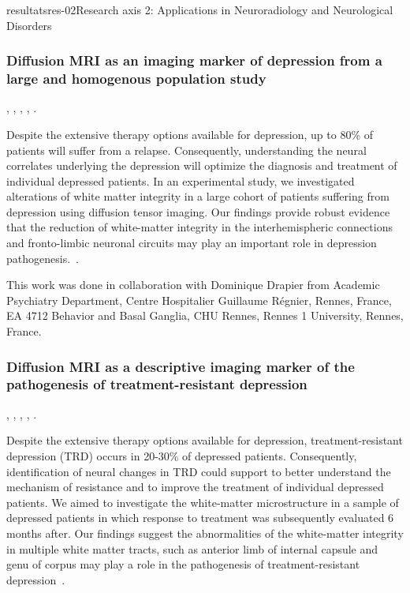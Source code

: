 \documentclass{ra2018}
\begin{document}
\begin{module}{resultats}{res-02}{Research axis 2: Applications in Neuroradiology and Neurological Disorders}
\subsubsection{Diffusion MRI as an imaging marker of depression from a large and homogenous population study}
\begin{participants}
      ,
      ,
      ,
      ,
      .
\end{participants}
Despite the extensive therapy options available for depression, up to 80\% of patients will suffer from a relapse. Consequently, understanding the neural correlates underlying the depression will optimize the diagnosis and treatment of individual depressed patients. In an experimental study, we investigated alterations of white matter integrity in a large cohort of patients suffering from depression using diffusion tensor imaging. Our findings provide robust evidence that the reduction of white-matter integrity in the interhemispheric connections and fronto-limbic neuronal circuits may play an important role in depression pathogenesis.~\cite{coloigner:hal-01812093}. 

This work was done in collaboration with Dominique Drapier from Academic Psychiatry Department, Centre Hospitalier Guillaume Régnier, Rennes, France, EA 4712 Behavior and Basal Ganglia, CHU Rennes, Rennes 1 University, Rennes, France.

\subsubsection{Diffusion MRI as a descriptive imaging marker of the pathogenesis of treatment-resistant depression}
\begin{participants}
      ,
      ,
      ,
      ,
      .
\end{participants}
Despite the extensive therapy options available for depression, treatment-resistant depression (TRD) occurs in 20-30\% of depressed patients. Consequently, identification of neural changes in TRD could support to better understand the mechanism of resistance and to improve the treatment of individual depressed patients. We aimed to investigate the white-matter microstructure in a sample of depressed patients in which response to treatment was subsequently evaluated 6 months after. Our findings suggest the abnormalities of the white-matter integrity in multiple white matter tracts, such as anterior limb of internal capsule and genu of corpus may play a role in the pathogenesis of treatment-resistant depression~\cite{coloigner:hal-01812087}.


\end{module}
\end{document}
